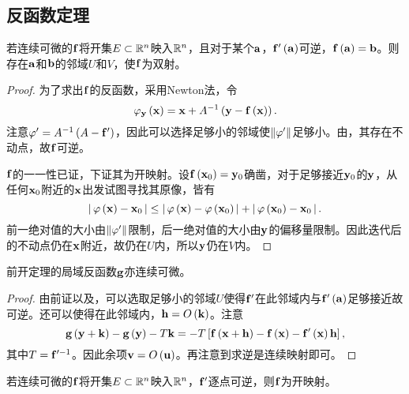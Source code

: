 \documentclass{ctexrep}
\begin{document}
  \subsection{反函数定理}
  \begin{theorem}
    若连续可微的$\mathbf{f}$将开集$E\subset \mathbb{R}^n$映入$\mathbb{R}^n$，且对于某个$\mathbf{a}$，$\mathbf{f}'\left(\mathbf{a}\right)$可逆，$\mathbf{f}\left(\mathbf{a}\right) = \mathbf{b}$。则存在$\mathbf{a}$和$\mathbf{b}$的邻域$U$和$V$，使$\mathbf{f}$为双射。
  \end{theorem}
  \begin{proof}
    为了求出$\mathbf{f}$的反函数，采用Newton法，令
    \[ \varphi_{\mathbf{y}}\left(\mathbf{x}\right) = \mathbf{x} + A^{-1}\left(\mathbf{y}-\mathbf{f}\left(\mathbf{x}\right)\right). \]
    注意$\varphi'=A^{-1}\left(A-\mathbf{f}'\right)$，因此可以选择足够小的邻域使$\left\| \varphi' \right\|$足够小。由，其存在不动点，故$\mathbf{f}$可逆。
    \par
    $\mathbf{f}$的一一性已证，下证其为开映射。设$\mathbf{f}\left(\mathbf{x}_0\right)=\mathbf{y}_0$确凿，对于足够接近$\mathbf{y}_0$的$\mathbf{y}$，从任何$\mathbf{x}_0$附近的$\mathbf{x}$出发试图寻找其原像，皆有
    \[ \left|\, \varphi\left(\mathbf{x}\right)-\mathbf{x}_0 \,\right|\le\left|\, \varphi\left(\mathbf{x}\right)-\varphi\left(\mathbf{x}_0\right) \,\right|+\left|\, \varphi\left(\mathbf{x}_0\right)-\mathbf{x}_0 \,\right|.\]
    前一绝对值的大小由$\left\| \varphi' \right\|$限制，后一绝对值的大小由$\mathbf{y}$的偏移量限制。因此迭代后的不动点仍在$\mathbf{x}$附近，故仍在$U$内，所以$\mathbf{y}$仍在$V$内。
  \end{proof}
  \begin{theorem}
    前开定理的局域反函数$\mathbf{g}$亦连续可微。
  \end{theorem}
  \begin{proof}
    由前证以及，可以选取足够小的邻域$U$使得$\mathbf{f}'$在此邻域内与$\mathbf{f}'\left(\mathbf{a}\right)$足够接近故可逆。还可以使得在此邻域内，$\mathbf{h} = O\left(\mathbf{k}\right)$。注意
    \[ \mathbf{g}\left(\mathbf{y}+\mathbf{k}\right)-\mathbf{g}\left(\mathbf{y}\right)-T\mathbf{k}=-T\left[\mathbf{f}\left(\mathbf{x}+\mathbf{h}\right)-\mathbf{f}\left(\mathbf{x}\right)-\mathbf{f}'\left(\mathbf{x}\right)\mathbf{h}\right], \]
    其中$T=\mathbf{f}'^{-1}$。因此余项$\mathbf{v}=O\left(\mathbf{u}\right)$。再注意到求逆是连续映射即可。
  \end{proof}
  \begin{theorem}
    若连续可微的$\mathbf{f}$将开集$E\subset \mathbb{R}^n$映入$\mathbb{R}^n$，$\mathbf{f}'$逐点可逆，则$\mathbf{f}$为开映射。
  \end{theorem}
\end{document}
